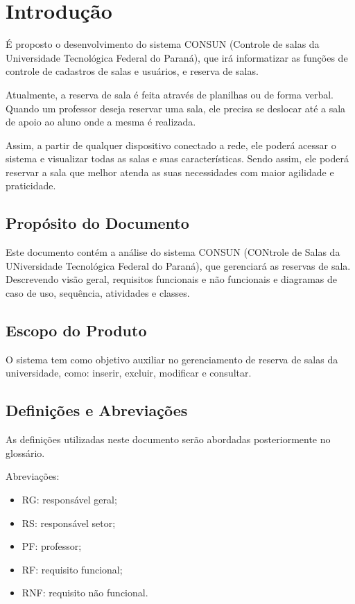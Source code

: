 \chapter{Introduç\~ao}
	\'E proposto o desenvolvimento do sistema CONSUN (Controle de salas da Universidade Tecnológica Federal do Paran\'a), que irá informatizar as funções de controle de cadastros de salas e usuários, e reserva de salas.
		
	Atualmente, a reserva de sala é feita através de planilhas ou de forma verbal. Quando um professor deseja reservar uma sala, ele precisa se deslocar até a sala de apoio ao aluno onde a mesma é realizada. 
	
	Assim, a partir de qualquer dispositivo conectado a rede, ele poderá acessar o sistema e visualizar todas as salas e suas características. Sendo assim, ele poderá reservar a sala que melhor atenda as suas necessidades com maior agilidade e praticidade.	
	

\section{Prop\'osito do Documento}
	Este documento cont\'em a análise do sistema CONSUN (CONtrole de Salas da UNiversidade Tecnol\'ogica Federal do Paran\'a), que gerenciará as reservas de sala. Descrevendo visão geral, requisitos funcionais e não funcionais e diagramas de caso de uso, sequência, atividades e classes.
	
\section{Escopo do Produto}
	O sistema tem como objetivo auxiliar no gerenciamento de reserva de salas da universidade, como: inserir, excluir, modificar e consultar.
	
\section{Definiç\~oes e Abreviaç\~oes}
	As definiç\~oes utilizadas neste documento ser\~ao abordadas posteriormente no gloss\'ario.	
	
	Abreviaç\~oes:	
		\begin{itemize}%
		    \item RG: respons\'avel geral;
		    \item RS: respons\'avel setor;
		    \item PF: professor;
			\item RF: requisito funcional;
			\item RNF: requisito n\~ao funcional.
		\end{itemize}			
		
	

